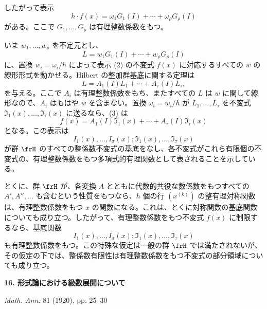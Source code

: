 \documentclass[11pt]{article}
\begin{document}
したがって表示
\begin{equation}
        h\cdot f(x)=\omega_1G_1(I)+\cdots+\omega_\rho G_\rho(I)
\end{equation}
がある。ここで \(G_1,\ldots,G_\rho\) は有理整数係数をもつ。

いま \(w_1,\ldots,w_\rho\) を不定元とし、
\[
        L=w_1G_1(I)+\cdots+w_\rho G_\rho(I)
\]
に、置換 \(w_i=\omega_i/h\) によって表示 (2) の不変式 \(f(x)\) に対応するすべての \(w\) の線形形式を動かせる。Hilbert の整加群基底に関する定理は
\begin{equation}
        L=A_1(I)L_1+\cdots+A_\tau(I)L_\tau,
\end{equation}
を与える。ここで \(A_i\) は有理整数係数をもち、またすべての \(L\) は \(w\) に関して線形なので、\(A_i\) はもはや \(w\) を含まない。置換 \(\omega_i=w_i/h\) が \(L_1,\ldots,L_\tau\) を不変式 \(\mathfrak I_1(x),\ldots,\mathfrak I_\tau(x)\) に送るなら、(3) は
\begin{equation}
        f(x)=A_1(I)\mathfrak I_1(x)+\cdots+A_\tau(I)\mathfrak I_\tau(x)
\end{equation}
となる。この表示は
\[
        I_1(x),\ldots,I_\sigma(x);\mathfrak I_1(x),\ldots,\mathfrak I_\tau(x)
\]
が群 \(\frH\) のすべての整係数不変式の基底をなし、各不変式がこれら有限個の不変式の、有理整数係数をもつ多項式的有理関数として表されることを示している。

とくに、群 \(\frH\) が、各変換 \(A\) とともに代数的共役な数係数をもつすべての \(A',A'',\ldots\) も含むという性質をもつなら、\(h\) 個の行 \((x^{(k)})\) の整有理対称関数は、有理整数係数をもつ \(x\) の関数になる。これは、とくに対称関数の基底関数についても成り立つ。したがって、有理整数係数をもつ不変式 \(f(x)\) に制限するなら、基底関数
\[
        I_1(x),\ldots,I_\sigma(x);\mathfrak I_1(x),\ldots,\mathfrak I_\tau(x)
\]
も有理整数係数をもつ。この特殊な仮定は一般の群 \(\frH\) では満たされないが、その仮定の下では、整係数有限性は有理整数係数をもつ不変式の部分領域についても成り立つ。





\clearpage
\begin{center}
{\Large\bfseries 16. 形式論における級数展開について}\par
\vspace{1em}
\emph{Math. Ann.} 81 (1920), pp. 25--30
\end{center}
\end{document}
